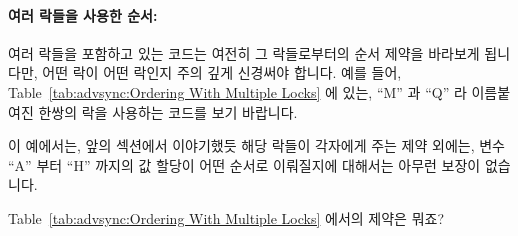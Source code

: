 \begin{enumerate}
\paragraph{여러 락들을 사용한 순서:}
여러 락들을 포함하고 있는 코드는 여전히 그 락들로부터의 순서 제약을 바라보게
됩니다만, 어떤 락이 어떤 락인지 주의 깊게 신경써야 합니다.
예를 들어, Table~\ref{tab:advsync:Ordering With Multiple Locks} 에 있는, ``M''
과 ``Q'' 라 이름붙여진 한쌍의 락을 사용하는 코드를 보기 바랍니다.

\begin{table}[htbp]
\scriptsize{}
\caption{Ordering With Multiple Locks}
\label{tab:advsync:Ordering With Multiple Locks}
\end{table}

이 예에서는, 앞의 섹션에서 이야기했듯 해당 락들이 각자에게 주는 제약 외에는,
변수 ``A'' 부터 ``H'' 까지의 값 할당이 어떤 순서로 이뤄질지에 대해서는 아무런
보장이 없습니다.

\QuickQuiz{}
	Table~\ref{tab:advsync:Ordering With Multiple Locks} 에서의 제약은
	뭐죠?

{}
\end{enumerate}
